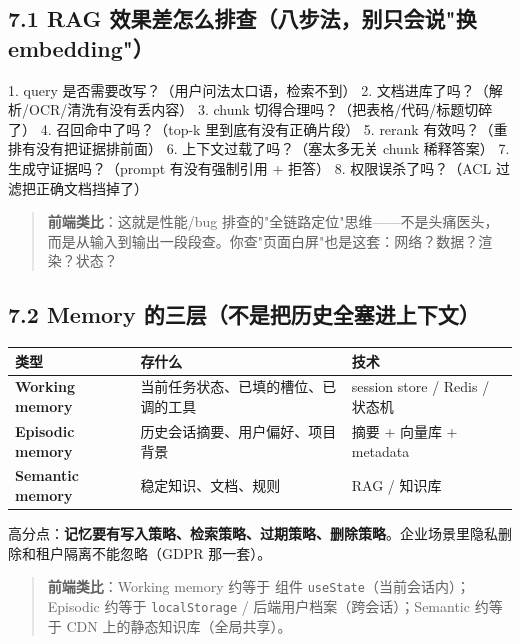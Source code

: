 \subsection{7.1 RAG 效果差怎么排查（八步法，别只会说"换 embedding"）}

\begin{codeblock}
1. query 是否需要改写？（用户问法太口语，检索不到）
2. 文档进库了吗？（解析/OCR/清洗有没有丢内容）
3. chunk 切得合理吗？（把表格/代码/标题切碎了）
4. 召回命中了吗？（top-k 里到底有没有正确片段）
5. rerank 有效吗？（重排有没有把证据排前面）
6. 上下文过载了吗？（塞太多无关 chunk 稀释答案）
7. 生成守证据吗？（prompt 有没有强制引用 + 拒答）
8. 权限误杀了吗？（ACL 过滤把正确文档挡掉了）
\end{codeblock}

\begin{quote}
 \textbf{前端类比}：这就是性能/bug 排查的"全链路定位"思维——不是头痛医头，而是从输入到输出一段段查。你查"页面白屏"也是这套：网络？数据？渲染？状态？
\end{quote}

\subsection{7.2 Memory 的三层（不是把历史全塞进上下文）}

\begingroup
\scriptsize
\setlength{\tabcolsep}{3pt}
\begin{longtable}{|p{}|p{}|p{}|}
\hline
类型 & 存什么 & 技术 \\ \hline
\textbf{Working memory} & 当前任务状态、已填的槽位、已调的工具 & session store / Redis / 状态机 \\ \hline
\textbf{Episodic memory} & 历史会话摘要、用户偏好、项目背景 & 摘要 + 向量库 + metadata \\ \hline
\textbf{Semantic memory} & 稳定知识、文档、规则 & RAG / 知识库 \\ \hline
\end{longtable}
\endgroup

高分点：\textbf{记忆要有写入策略、检索策略、过期策略、删除策略}。企业场景里隐私删除和租户隔离不能忽略（GDPR 那一套）。

\begin{quote}
 \textbf{前端类比}：Working memory 约等于 组件 \texttt{useState}（当前会话内）；Episodic 约等于 \texttt{localStorage} / 后端用户档案（跨会话）；Semantic 约等于 CDN 上的静态知识库（全局共享）。
\end{quote}

